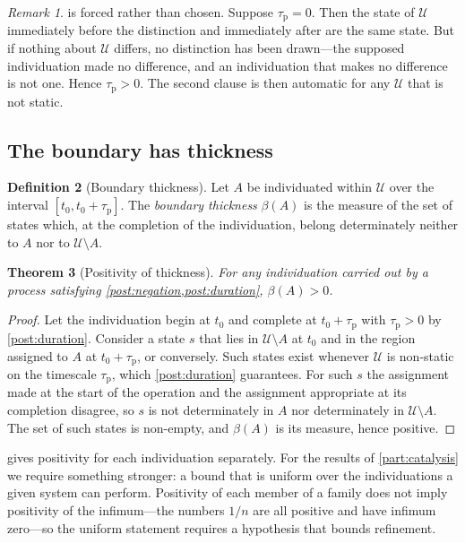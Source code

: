 \documentclass[11pt,twocolumn,a4paper]{article}
\theoremstyle{plain}
\newtheorem{theorem}{Theorem}[section]
\theoremstyle{definition}
\newtheorem{definition}[theorem]{Definition}
\theoremstyle{remark}
\newtheorem{remark}[theorem]{Remark}
\newcommand{\Univ}{\mathcal{U}}
\newcommand{\thick}{\beta}
\newcommand{\taup}{\tau_{\mathrm{p}}}
\begin{document}
\begin{remark}
 is forced rather than chosen. Suppose $\taup = 0$. Then the
state of $\Univ$ immediately before the distinction and immediately after are
the same state. But if nothing about $\Univ$ differs, no distinction has been
drawn---the supposed individuation made no difference, and an individuation that
makes no difference is not one. Hence $\taup > 0$. The second clause is then
automatic for any $\Univ$ that is not static.
\end{remark}

\subsection{The boundary has thickness}

\begin{definition}[Boundary thickness]
\label{def:thickness}
Let $A$ be individuated within $\Univ$ over the interval $[t_0, t_0+\taup]$. The
\emph{boundary thickness} $\thick(A)$ is the measure of the set of states which,
at the completion of the individuation, belong determinately neither to $A$ nor
to $\Univ\setminus A$.
\end{definition}

\begin{theorem}[Positivity of thickness]
\label{thm:floor}
For any individuation carried out by a process satisfying
\cref{post:negation,post:duration}, $\thick(A) > 0$.
\end{theorem}

\begin{proof}
Let the individuation begin at $t_0$ and complete at $t_0+\taup$ with
$\taup>0$ by \cref{post:duration}. Consider a state $s$ that lies in
$\Univ\setminus A$ at $t_0$ and in the region assigned to $A$ at $t_0+\taup$, or
conversely. Such states exist whenever $\Univ$ is non-static on the timescale
$\taup$, which \cref{post:duration} guarantees. For such $s$ the assignment made
at the start of the operation and the assignment appropriate at its completion
disagree, so $s$ is not determinately in $A$ nor determinately in
$\Univ\setminus A$. The set of such states is non-empty, and $\thick(A)$ is its
measure, hence positive.
\end{proof}

 gives positivity for each individuation separately. For the
results of \cref{part:catalysis} we require something stronger: a bound that is
uniform over the individuations a given system can perform. Positivity of each
member of a family does not imply positivity of the infimum---the numbers
$1/n$ are all positive and have infimum zero---so the uniform statement requires
a hypothesis that bounds refinement.
\end{document}
